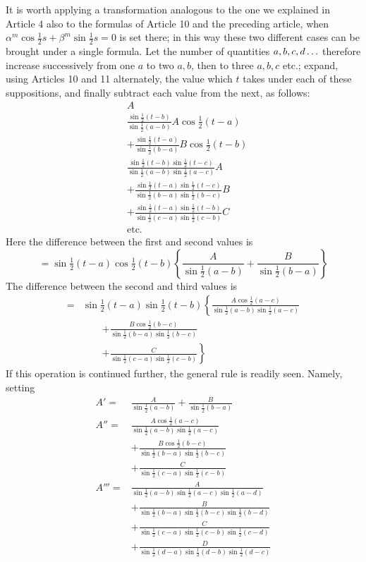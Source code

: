 \begingroup
\renewcommand{\arraystretch}{1.45}
It is worth applying a transformation analogous to the one we explained in Article 4
also to the formulas of Article 10 and the preceding article, when $\alpha^m\cos\tfrac12s+\beta^m\sin\tfrac12s=0$
is set there; in this way these two different cases can be brought under a single formula.
Let the number of quantities $a,b,c,d\mathinner{.\,.\,.}$ therefore increase successively
from one $a$ to two $a,b$, then to three $a,b,c$ etc.; expand, using
Articles 10 and 11 alternately, the value which $t$ takes under each of these suppositions, and finally
subtract each value from the next, as follows:
\[
\begin{aligned}
&A\\[5pt]
&\frac{\sin\tfrac12(t-b)}{\sin\tfrac12(a-b)}A\cos\tfrac12(t-a)\\[5pt]
&+\frac{\sin\tfrac12(t-a)}{\sin\tfrac12(b-a)}B\cos\tfrac12(t-b)\\[5pt]
&\frac{\sin\tfrac12(t-b)\sin\tfrac12(t-c)}{\sin\tfrac12(a-b)\sin\tfrac12(a-c)}A\\[5pt]
&+\frac{\sin\tfrac12(t-a)\sin\tfrac12(t-c)}{\sin\tfrac12(b-a)\sin\tfrac12(b-c)}B\\[5pt]
&+\frac{\sin\tfrac12(t-a)\sin\tfrac12(t-b)}{\sin\tfrac12(c-a)\sin\tfrac12(c-b)}C\\[5pt]
&\text{etc.}
\end{aligned}
\]
Here the difference between the first and second values is
\[
=\sin\tfrac12(t-a)\cos\tfrac12(t-b)
\left\{\frac{A}{\sin\tfrac12(a-b)}+\frac{B}{\sin\tfrac12(b-a)}\right\}
\]
The difference between the second and third values is
\[
\begin{aligned}
={}&\sin\tfrac12(t-a)\sin\tfrac12(t-b)\left\{
\frac{A\cos\tfrac12(a-c)}{\sin\tfrac12(a-b)\sin\tfrac12(a-c)}\right.\\[5pt]&\qquad\left.
+\frac{B\cos\tfrac12(b-c)}{\sin\tfrac12(b-a)\sin\tfrac12(b-c)}\right.\\[5pt]&\qquad\left.
+\frac{C}{\sin\tfrac12(c-a)\sin\tfrac12(c-b)}\right\}
\end{aligned}
\]
If this operation is continued further, the general rule is readily seen. Namely, setting
\[
\begin{aligned}
A'={}&\frac{A}{\sin\tfrac12(a-b)}+\frac{B}{\sin\tfrac12(b-a)}\\[5pt]
A''={}&\frac{A\cos\tfrac12(a-c)}{\sin\tfrac12(a-b)\sin\tfrac12(a-c)}\\[5pt]
&+\frac{B\cos\tfrac12(b-c)}{\sin\tfrac12(b-a)\sin\tfrac12(b-c)}\\[5pt]
&+\frac{C}{\sin\tfrac12(c-a)\sin\tfrac12(c-b)}\\[5pt]
A'''={}&\frac{A}{\sin\tfrac12(a-b)\sin\tfrac12(a-c)\sin\tfrac12(a-d)}\\[5pt]
&+\frac{B}{\sin\tfrac12(b-a)\sin\tfrac12(b-c)\sin\tfrac12(b-d)}\\[5pt]
&+\frac{C}{\sin\tfrac12(c-a)\sin\tfrac12(c-b)\sin\tfrac12(c-d)}\\[5pt]
&+\frac{D}{\sin\tfrac12(d-a)\sin\tfrac12(d-b)\sin\tfrac12(d-c)}\\[5pt]
\end{aligned}\]
